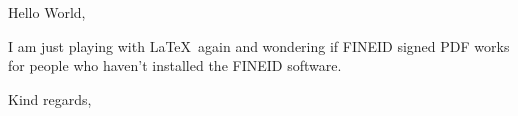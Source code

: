 \documentclass{letter}
\begin{document}
\begin{letter}{}
\opening{Hello World,}

I am just playing with \LaTeX\ again and wondering if FINEID signed PDF works for people who haven't installed the FINEID software.

\closing{Kind regards,}


\end{letter}
\end{document}
